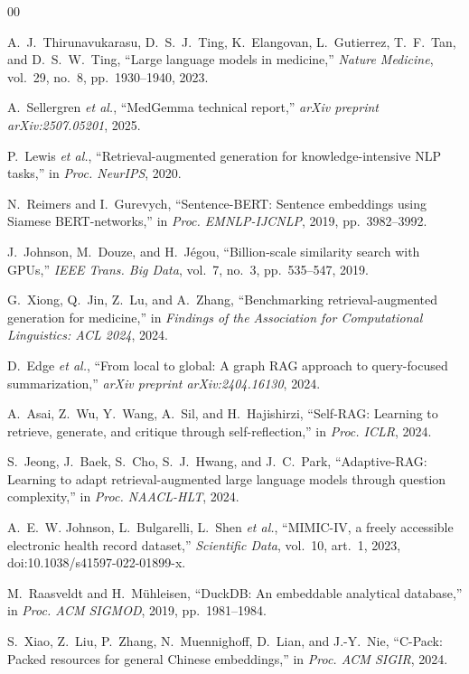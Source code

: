 \documentclass[preprint,12pt]{elsarticle}
\begin{document}
\begin{thebibliography}{00}

 A.~J.~Thirunavukarasu, D.~S.~J.~Ting, K.~Elangovan, L.~Gutierrez, T.~F.~Tan, and D.~S.~W.~Ting, ``Large language models in medicine,'' \textit{Nature Medicine}, vol.~29, no.~8, pp.~1930--1940, 2023.

 A.~Sellergren \textit{et al.}, ``MedGemma technical report,'' \textit{arXiv preprint arXiv:2507.05201}, 2025.

 P.~Lewis \textit{et al.}, ``Retrieval-augmented generation for knowledge-intensive NLP tasks,'' in \textit{Proc. NeurIPS}, 2020.

 N.~Reimers and I.~Gurevych, ``Sentence-BERT: Sentence embeddings using Siamese BERT-networks,'' in \textit{Proc. EMNLP-IJCNLP}, 2019, pp.~3982--3992.

 J.~Johnson, M.~Douze, and H.~J\'egou, ``Billion-scale similarity search with GPUs,'' \textit{IEEE Trans. Big Data}, vol.~7, no.~3, pp.~535--547, 2019.

 G.~Xiong, Q.~Jin, Z.~Lu, and A.~Zhang, ``Benchmarking retrieval-augmented generation for medicine,'' in \textit{Findings of the Association for Computational Linguistics: ACL 2024}, 2024.

 D.~Edge \textit{et al.}, ``From local to global: A graph RAG approach to query-focused summarization,'' \textit{arXiv preprint arXiv:2404.16130}, 2024.

 A.~Asai, Z.~Wu, Y.~Wang, A.~Sil, and H.~Hajishirzi, ``Self-RAG: Learning to retrieve, generate, and critique through self-reflection,'' in \textit{Proc. ICLR}, 2024.

 S.~Jeong, J.~Baek, S.~Cho, S.~J.~Hwang, and J.~C.~Park, ``Adaptive-RAG: Learning to adapt retrieval-augmented large language models through question complexity,'' in \textit{Proc. NAACL-HLT}, 2024.

 A.~E.~W. Johnson, L.~Bulgarelli, L.~Shen \textit{et al.}, ``MIMIC-IV, a freely accessible electronic health record dataset,'' \textit{Scientific Data}, vol.~10, art.~1, 2023, doi:10.1038/s41597-022-01899-x.

 M.~Raasveldt and H.~M\"uhleisen, ``DuckDB: An embeddable analytical database,'' in \textit{Proc. ACM SIGMOD}, 2019, pp.~1981--1984.

 S.~Xiao, Z.~Liu, P.~Zhang, N.~Muennighoff, D.~Lian, and J.-Y.~Nie, ``C-Pack: Packed resources for general Chinese embeddings,'' in \textit{Proc. ACM SIGIR}, 2024.


\end{thebibliography}
\end{document}
